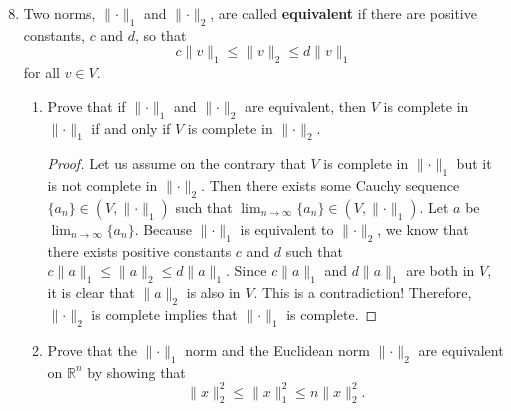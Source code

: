 \documentclass{article}
\begin{document}
\begin{enumerate}
      \setcounter{enumi}{7}
      \item Two norms, $\lVert\cdot\rVert_1$ and $\lVert\cdot\rVert_2$, are
            called \textbf{equivalent} if there are positive constants, $c$ and
            $d$, so that
            \[
                  c\lVert v\rVert_1\leq\lVert v\rVert_2\leq d\lVert v\rVert_1
            \]
            for all $v\in V$.
            \begin{enumerate}
                  \item Prove that if $\lVert\cdot\rVert_1$ and
                        $\lVert\cdot\rVert_2$  are equivalent, then $V$ is
                        complete in $\lVert\cdot\rVert_1$ if and only if $V$ is
                        complete in $\lVert\cdot\rVert_2$.
                        \begin{proof}
                              Let us assume on the contrary that $V$ is complete
                              in $\lVert\cdot\rVert_1$ but it is not complete in
                              $\lVert\cdot\rVert_2$. Then there exists some Cauchy
                              sequence $\{a_n\}\in(V,\lVert\cdot\rVert_1)$ such that
                              $\lim_{n\to\infty}\{a_n\}\in(V,\lVert\cdot\rVert_1)$.
                              Let $a$ be $\lim_{n\to\infty}\{a_n\}$.
                              Because $\lVert\cdot\rVert_1$ is equivalent to
                              $\lVert\cdot\rVert_2$, we know that there exists
                              positive constants $c$ and $d$ such that
                              $c\lVert a\rVert_1\leq\lVert a\rVert_2\leq d\lVert a\rVert_1$.
                              Since $c\lVert a\rVert_1$ and $d\lVert a\rVert_1$
                              are both in $V$, it is clear that $\lVert a\rVert_2$
                              is also in $V$. This is a contradiction! Therefore,
                              $\lVert\cdot\rVert_2$ is complete implies that
                              $\lVert\cdot\rVert_1$ is complete.
                        \end{proof}
                  \item Prove that the $\lVert\cdot\rVert_1$ norm and the
                        Euclidean norm $\lVert\cdot\rVert_2$ are equivalent on
                        $\mathbb{R}^n$ by showing that
                        \[
                              \lVert x\rVert_2^2
                              \leq \lVert x\rVert_1^2
                              \leq n\lVert x\rVert_2^2.
\]
\end{enumerate}
\end{enumerate}
\end{document}
